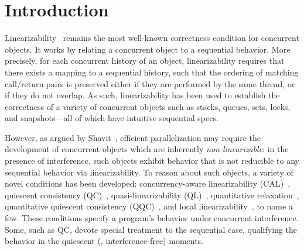 

\section{Introduction}
\label{sec:introduction}

%


Linearizability~\cite{Herlihy-Wing:TOPLAS90} remains the
most well-known correctness condition for concurrent objects.
% 
It works by relating a concurrent object to a sequential behavior.
More precisely, for each concurrent history of an object,
linearizability requires that there exists a mapping to a sequential
history, such that the ordering of matching call/return pairs is
preserved either if they are performed by the same thread, or if they
do not overlap.
%
As such, linearizability has been used to establish the correctness of
a variety of concurrent objects such as stacks, queues, sets, locks,
and snapshots---all of which have intuitive sequential specs.
%

However, as argued by Shavit~\cite{Shavit:CACM11}, efficient
parallelization may require the development of concurrent objects
which are inherently \emph{non-linearizable}: in the presence of
interference, such objects exhibit behavior that is not reducible to
any sequential behavior via linearizability. To reason about such
objects, a variety of novel conditions has been developed:
concurrency-aware linearizability (CAL)~\cite{Hemed-Rinetzky:PODC14},
quiescent consistency (QC)~\cite{Aspnes-al:JACM94,Derrick-al:FM14},
quasi-linearizability (QL)~\cite{Afek-al:OPODIS10}, quantitative
relaxation~\cite{Henzinger-al:POPL13}, quantitative quiescent
consistency (QQC)~\cite{Jagadeesan-Riely:ICALP14}, and local
linearizability~\cite{Haas-al-local15}, to name a few.
%
These conditions specify a program's behavior under concurrent
interference. Some, such as QC, devote special treatment to the
sequential case, qualifying the behavior in the quiescent (\ie,
interference-free) moments.
%

